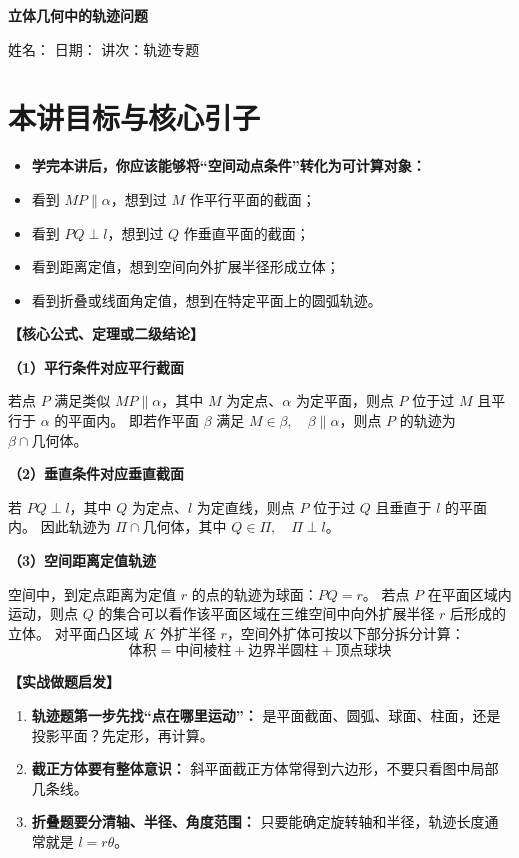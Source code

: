 \documentclass[11pt,a4paper]{ctexart}
\newcommand{\lessoninfo}[4]{%
  \begin{center}
    {\LARGE\bfseries #1}\par
    \vspace{0.8em}
    {\small 姓名：#2 \quad 日期：#3 \quad 讲次：#4}
  \end{center}
  \vspace{0.6em}
}
\begin{document}
\lessoninfo{立体几何中的轨迹问题}{\blank{2.6cm}}{\blank{2.6cm}}{轨迹专题}

\section{本讲目标与核心引子}

\begin{itemize}[itemsep=0.3em]
  \item \textbf{学完本讲后，你应该能够将“空间动点条件”转化为可计算对象：}
  \item 看到 $MP\parallel \alpha$，想到过 $M$ 作平行平面的截面；
  \item 看到 $PQ\perp l$，想到过 $Q$ 作垂直平面的截面；
  \item 看到距离定值，想到空间向外扩展半径形成立体；
  \item 看到折叠或线面角定值，想到在特定平面上的圆弧轨迹。
\end{itemize}

\vspace{0.5em}
\noindent\textbf{【核心公式、定理或二级结论】}

\textbf{（1）平行条件对应平行截面}

若点 $P$ 满足类似 $MP\parallel \alpha$，其中 $M$ 为定点、$\alpha$ 为定平面，则点 $P$ 位于过 $M$ 且平行于 $\alpha$ 的平面内。
即若作平面 $\beta$ 满足 $M\in\beta,\quad \beta\parallel\alpha$，则点 $P$ 的轨迹为 $\beta\cap \text{几何体}$。

\textbf{（2）垂直条件对应垂直截面}

若 $PQ\perp l$，其中 $Q$ 为定点、$l$ 为定直线，则点 $P$ 位于过 $Q$ 且垂直于 $l$ 的平面内。
因此轨迹为 $\Pi\cap \text{几何体}$，其中 $Q\in\Pi,\quad \Pi\perp l$。

\textbf{（3）空间距离定值轨迹}

空间中，到定点距离为定值 $r$ 的点的轨迹为球面：$PQ=r$。
若点 $P$ 在平面区域内运动，则点 $Q$ 的集合可以看作该平面区域在三维空间中向外扩展半径 $r$ 后形成的立体。
对平面凸区域 $K$ 外扩半径 $r$，空间外扩体可按以下部分拆分计算：
\[ \text{体积} = \text{中间棱柱} + \text{边界半圆柱} + \text{顶点球块} \]

\vspace{0.5em}
\noindent\textbf{【实战做题启发】}
\begin{enumerate}[itemsep=0.2em]
  \item \textbf{轨迹题第一步先找“点在哪里运动”：} 是平面截面、圆弧、球面、柱面，还是投影平面？先定形，再计算。
  \item \textbf{截正方体要有整体意识：} 斜平面截正方体常得到六边形，不要只看图中局部几条线。
  \item \textbf{折叠题要分清轴、半径、角度范围：} 只要能确定旋转轴和半径，轨迹长度通常就是 $l = r\theta$。
\end{enumerate}
\end{document}
